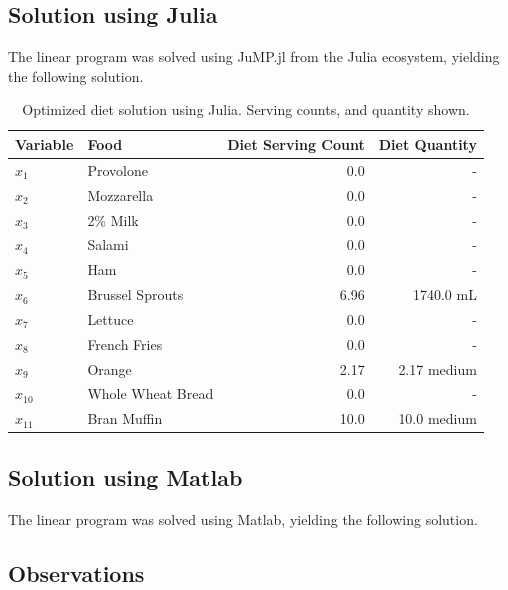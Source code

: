 \documentclass{article}
\begin{document}
    \subsection{Solution using Julia}

    The linear program was solved using JuMP.jl from the Julia ecosystem, yielding the following solution.

    \begin{table}[H]
        \centering
        \begin{tabular}{@{}llrr@{}}
        \toprule
        Variable & Food & Diet Serving Count & Diet Quantity \\ \midrule
        $x_1$    & Provolone         & 0.0  & - \\
        $x_2$    & Mozzarella        & 0.0  & - \\
        $x_3$    & 2\% Milk          & 0.0  & - \\
        $x_4$    & Salami            & 0.0  & - \\
        $x_5$    & Ham               & 0.0  & - \\
        $x_6$    & Brussel Sprouts   & 6.96 & 1740.0 mL \\
        $x_7$    & Lettuce           & 0.0  & - \\
        $x_8$    & French Fries      & 0.0  & - \\
        $x_9$    & Orange            & 2.17 & 2.17 medium \\
        $x_{10}$ & Whole Wheat Bread & 0.0  & - \\
        $x_{11}$ & Bran Muffin       & 10.0 & 10.0 medium \\ \bottomrule
        \end{tabular}
        \caption{Optimized diet solution using Julia. Serving counts, and quantity shown.}
        \label{tab:Q1_Julia_Solution}
    \end{table}

    \subsection{Solution using Matlab}

    The linear program was solved using Matlab, yielding the following solution.


    \subsection{Observations}
\end{document}
